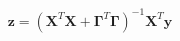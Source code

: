 \documentclass[10pt]{article}
\begin{document}
\begin{align*}\boldsymbol z = \left( \boldsymbol X^T \boldsymbol X + \boldsymbol \Gamma^T \boldsymbol \Gamma \right)^{-1} \boldsymbol X^T \boldsymbol y\end{align*}
\end{document}
